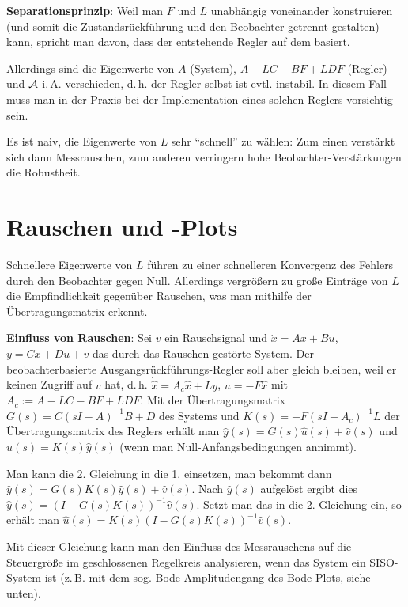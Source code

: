 \textbf{Separationsprinzip}:
Weil man $F$ und $L$ unabhängig voneinander konstruieren
(und somit die Zustandsrückführung und den Beobachter getrennt gestalten) kann,
spricht man davon, dass der entstehende Regler auf dem
 basiert.

Allerdings sind die Eigenwerte von $A$ (System), $A - LC - BF + LDF$ (Regler) und $\mathcal{A}$ i.\,A.
verschieden, d.\,h. der Regler selbst ist evtl. instabil.
In diesem Fall muss man in der Praxis bei der Implementation eines solchen Reglers vorsichtig
sein.

Es ist naiv, die Eigenwerte von $L$ sehr "`schnell"' zu wählen:
Zum einen verstärkt sich dann Messrauschen, zum anderen verringern hohe Beobachter-Verstärkungen
die Robustheit.

\pagebreak

\section{%
    Rauschen und -Plots%
}

Schnellere Eigenwerte von $L$ führen zu einer schnelleren Konvergenz des Fehlers durch den
Beobachter gegen Null.
Allerdings vergrößern zu große Einträge von $L$ die Empfindlichkeit gegenüber Rauschen,
was man mithilfe der Übertragungsmatrix erkennt.

\textbf{Einfluss von Rauschen}:
Sei $v$ ein Rauschsignal und $\dot{x} = Ax + Bu$, $y = Cx + Du + v$ das durch das Rauschen
gestörte System.
Der beobachterbasierte Ausgangsrückführungs-Regler soll aber gleich bleiben, weil er keinen
Zugriff auf $v$ hat, d.\,h.
$\dot{\widehat{x}} = A_c \widehat{x} + Ly$, $u = -F\widehat{x}$
mit $A_c := A - LC - BF + LDF$.
Mit der Übertragungsmatrix $G(s) = C (sI - A)^{-1} B + D$ des Systems und
$K(s) = -F(sI - A_c)^{-1} L$ der Übertragungsmatrix des Reglers erhält man
$\widehat{y}(s) = G(s) \widehat{u}(s) + \widehat{v}(s)$ und
$\widehat{u}(s) = K(s) \widehat{y}(s)$
(wenn man Null-Anfangsbedingungen annimmt).

Man kann die 2. Gleichung in die 1. einsetzen,
man bekommt dann $\widehat{y}(s) = G(s)K(s) \widehat{y}(s) + \widehat{v}(s)$.
Nach $\widehat{y}(s)$ aufgelöst ergibt dies
$\widehat{y}(s) = (I - G(s)K(s))^{-1} \widehat{v}(s)$.
Setzt man das in die 2. Gleichung ein, so erhält man
$\widehat{u}(s) = K(s) (I - G(s)K(s))^{-1} \widehat{v}(s)$.

Mit dieser Gleichung kann man den Einfluss des Messrauschens auf die Steuergröße im geschlossenen
Regelkreis analysieren, wenn das System ein SISO-System ist
(z.\,B. mit dem sog. Bode-Amplitudengang des Bode-Plots, siehe unten).

